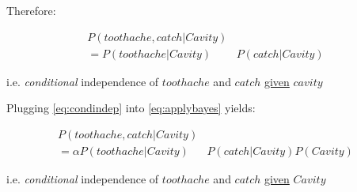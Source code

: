 \begin{frame}


Therefore:
\slidesonly{\vspace{-5mm}
}

\begin{align}
P(\mathit{toothache}
, \mathit{catch}
 | \mathit{Cavity}) &\\
= P(\mathit{toothache}
| \mathit{Cavity}) &P(\mathit{catch}
| \mathit{Cavity})
\label{eq:condindep}
\end{align}

i.e. \emph{conditional} independence of $\mathit{toothache}$ and $\mathit{catch}$ \underline{given} $\mathit{cavity}$

\pause

Plugging \eqref{eq:condindep} into \eqref{eq:applybayes} yields:

\slidesonly{\vspace{-4mm}}

\begin{align}
P(\mathit{toothache}, \mathit{catch} | \mathit{Cavity}) &\\
= \alpha P(\mathit{toothache}| \mathit{Cavity}) &
P(\mathit{catch}| \mathit{Cavity}) P(\mathit{Cavity})
\end{align}

i.e. \emph{conditional} independence of $\mathit{toothache}$ and $\mathit{catch}$ \underline{given} $\mathit{Cavity}$
\end{frame}


